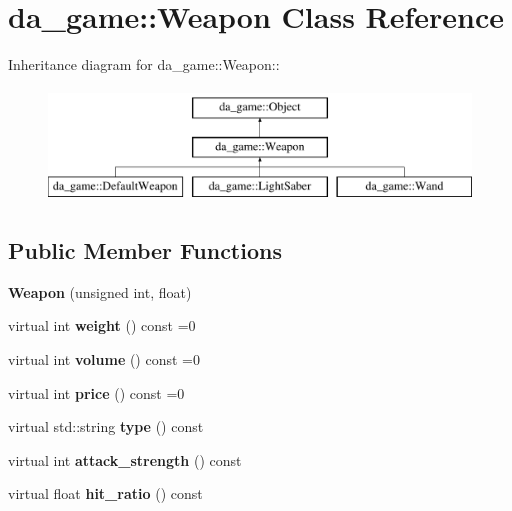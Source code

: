 \hypertarget{classda__game_1_1Weapon}{
\section{da\_\-game::Weapon Class Reference}
\label{classda__game_1_1Weapon}
}
Inheritance diagram for da\_\-game::Weapon::\begin{figure}[H]
\begin{center}
\leavevmode
\includegraphics[height=3cm]{classda__game_1_1Weapon}
\end{center}
\end{figure}
\subsection*{Public Member Functions}
\begin{DoxyCompactItemize}
\item 
\hypertarget{classda__game_1_1Weapon_a88a5f2653bd77a5c4676871de3667604}{
{\bfseries Weapon} (unsigned int, float)}
\label{classda__game_1_1Weapon_a88a5f2653bd77a5c4676871de3667604}

\item 
\hypertarget{classda__game_1_1Weapon_a771944b2740e932845cec03eb644b563}{
virtual int {\bfseries weight} () const =0}
\label{classda__game_1_1Weapon_a771944b2740e932845cec03eb644b563}

\item 
\hypertarget{classda__game_1_1Weapon_a8769a66179398eb6b1b26b418c5cdb9f}{
virtual int {\bfseries volume} () const =0}
\label{classda__game_1_1Weapon_a8769a66179398eb6b1b26b418c5cdb9f}

\item 
\hypertarget{classda__game_1_1Weapon_aae5de95ab6a421f4799fc2f56fe04711}{
virtual int {\bfseries price} () const =0}
\label{classda__game_1_1Weapon_aae5de95ab6a421f4799fc2f56fe04711}

\item 
\hypertarget{classda__game_1_1Weapon_a0b5b2840ddee8fb059dd03849b2d4617}{
virtual std::string {\bfseries type} () const }
\label{classda__game_1_1Weapon_a0b5b2840ddee8fb059dd03849b2d4617}

\item 
\hypertarget{classda__game_1_1Weapon_ad0d737c1f1535fba0e1152daaa844a55}{
virtual int {\bfseries attack\_\-strength} () const }
\label{classda__game_1_1Weapon_ad0d737c1f1535fba0e1152daaa844a55}

\item 
\hypertarget{classda__game_1_1Weapon_a7ef8c157cc461a7fc1958f76652b0415}{
virtual float {\bfseries hit\_\-ratio} () const }
\label{classda__game_1_1Weapon_a7ef8c157cc461a7fc1958f76652b0415}

\end{DoxyCompactItemize}
